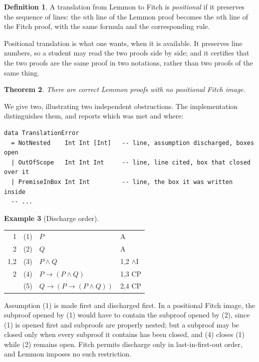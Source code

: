 \documentclass[11pt]{article}
\makeatletter
\theoremstyle{plain}
\newtheorem{theorem}{Theorem}
\theoremstyle{definition}
\newtheorem{definition}[theorem]{Definition}
\newtheorem{example}[theorem]{Example}
\theoremstyle{remark}
\newcommand{\dep}[1]{\textup{#1}}
\newenvironment{lemmonproof}
  {\begin{center}\begin{tabular}{@{}r@{\hspace{1.5em}}r@{\hspace{0.6em}}l@{\hspace{2.5em}}l@{}}}
  {\end{tabular}\end{center}}
\makeatother
\begin{document}
\begin{definition}
A translation from Lemmon to Fitch is \emph{positional} if it preserves the
sequence of lines: the $n$th line of the Lemmon proof becomes the $n$th line
of the Fitch proof, with the same formula and the corresponding rule.
\end{definition}

Positional translation is what one wants, when it is available. It preserves
line numbers, so a student may read the two proofs side by side; and it
certifies that the two proofs are the same proof in two notations, rather than
two proofs of the same thing.

\begin{theorem}\label{thm:notpositional}
There are correct Lemmon proofs with no positional Fitch image.
\end{theorem}

We give two, illustrating two independent obstructions. The implementation
distinguishes them, and reports which was met and where:

\begin{lstlisting}
data TranslationError
  = NotNested    Int Int [Int]   -- line, assumption discharged, boxes open
  | OutOfScope   Int Int Int     -- line, line cited, box that closed over it
  | PremiseInBox Int Int         -- line, the box it was written inside
  -- ...
\end{lstlisting}

\begin{example}[Discharge order]\label{ex:order}
\begin{lemmonproof}
\dep{1}   & (1) & $P$                        & A \\
\dep{2}   & (2) & $Q$                        & A \\
\dep{1,2} & (3) & $P \wedge Q$               & 1,2 $\wedge$I \\
\dep{2}   & (4) & $P \to (P \wedge Q)$       & 1,3 CP \\
          & (5) & $Q \to (P \to (P \wedge Q))$ & 2,4 CP \\
\end{lemmonproof}
\end{example}

\noindent Assumption (1) is made first and discharged first. In a positional
Fitch image, the subproof opened by (1) would have to contain the subproof
opened by (2), since (1) is opened first and subproofs are properly nested;
but a subproof may be closed only when every subproof it contains has been
closed, and (4) closes (1) while (2) remains open. Fitch permits discharge
only in last-in-first-out order, and Lemmon imposes no such restriction.
\end{document}
